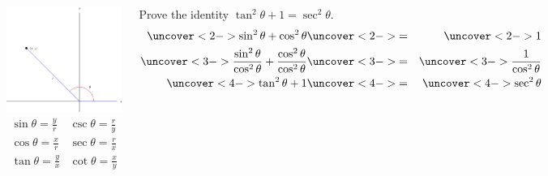 \begin{frame}
\begin{columns}[c]
\includegraphics[width=5cm]{trigonometry/pictures/app-d-ratiosb.pdf}%
\[
\begin{array}{cc}
\sin \theta = \frac{ y}{ r} &
\csc \theta = \frac{ r}{ y} \\
\cos \theta = \frac{ x}{ r} &
\sec \theta = \frac{ r}{ x} \\
\tan \theta = \frac{ y}{ x} &
\cot \theta = \frac{ x}{ y} \\
\end{array}
\]
\begin{example}[$\tan^2 \theta + 1 = \sec^2 \theta$]
Prove the identity $\tan^2 \theta + 1 = \sec^2 \theta$.
\begin{eqnarray*}
\uncover<2->{\sin^2 \theta + \cos^2 \theta} & \uncover<2->{=} & \uncover<2->{1}\\
\uncover<3->{\frac{\sin^2 \theta}{\cos^2\theta} + \frac{\cos^2 \theta}{\cos^2\theta}} & \uncover<3->{=} & \uncover<3->{\frac{1}{\cos^2\theta}}\\
\uncover<4->{\tan^2 \theta + 1} & \uncover<4->{=} & \uncover<4->{\sec^2\theta}
\end{eqnarray*}
\end{example}
\end{columns}
\end{frame}




